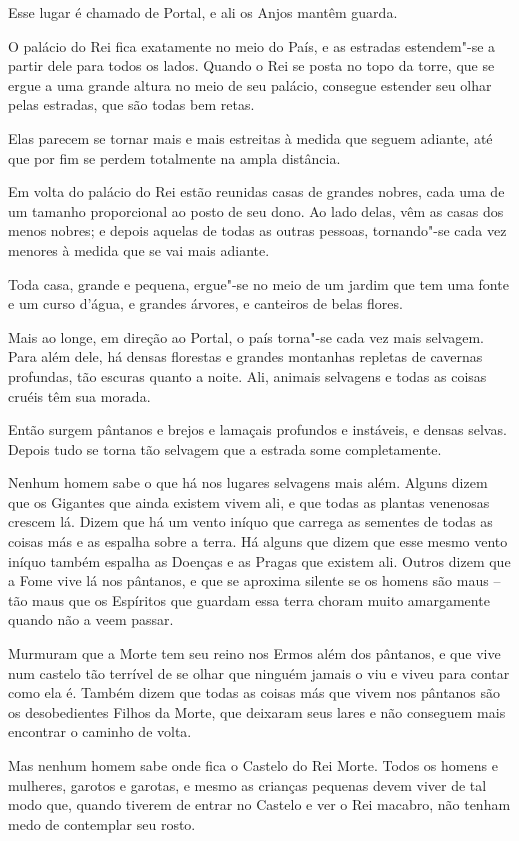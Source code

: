 Esse lugar é chamado de Portal, e ali os Anjos mantêm guarda.

O palácio do Rei fica exatamente no meio do País, e as estradas
estendem"-se a partir dele para todos os lados. Quando o Rei se posta no
topo da torre, que se ergue a uma grande altura no meio de seu palácio,
consegue estender seu olhar pelas estradas, que são todas bem retas.

Elas parecem se tornar mais e mais estreitas à medida que seguem
adiante, até que por fim se perdem totalmente na ampla distância.

Em volta do palácio do Rei estão reunidas casas de grandes nobres, cada
uma de um tamanho proporcional ao posto de seu dono. Ao lado delas, vêm
as casas dos menos nobres; e depois aquelas de todas as outras pessoas,
tornando"-se cada vez menores à medida que se vai mais adiante.

Toda casa, grande e pequena, ergue"-se no meio de um jardim que tem uma
fonte e um curso d'água, e grandes árvores, e canteiros de belas flores.

Mais ao longe, em direção ao Portal, o país torna"-se cada vez mais
selvagem. Para além dele, há densas florestas e grandes montanhas
repletas de cavernas profundas, tão escuras quanto a noite. Ali,
animais selvagens e todas as coisas cruéis têm sua morada.

Então surgem pântanos e brejos e lamaçais profundos e instáveis, e densas
selvas. Depois tudo se torna tão selvagem que a estrada some
completamente.

Nenhum homem sabe o que há nos lugares selvagens mais além. Alguns
dizem que os Gigantes que ainda existem vivem ali, e que todas as
plantas venenosas crescem lá. Dizem que há um vento iníquo que
carrega as sementes de todas as coisas más e as espalha sobre a terra.
Há alguns que dizem que esse mesmo vento iníquo também espalha as Doenças e
as Pragas que existem ali. Outros dizem que a Fome vive lá nos pântanos,
e que se aproxima silente se os homens são maus -- tão
maus que os Espíritos que guardam essa terra choram muito
amargamente quando não a veem passar.

Murmuram que a Morte tem seu reino nos Ermos além dos pântanos, e que vive
num castelo tão terrível de se olhar que ninguém jamais o viu e viveu
para contar como ela é. Também dizem que todas as coisas más que vivem nos
pântanos são os desobedientes Filhos da Morte, que deixaram seus lares e
não conseguem mais encontrar o caminho de volta.

Mas nenhum homem sabe onde fica o Castelo do Rei Morte. Todos os homens
e mulheres, garotos e garotas, e mesmo as crianças pequenas devem viver
de tal modo que, quando tiverem de entrar no Castelo e ver o Rei
macabro, não tenham medo de contemplar seu rosto.

